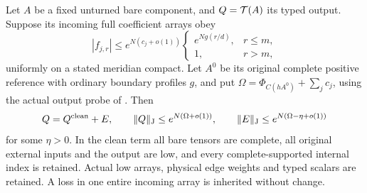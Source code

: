 \begin{theorem}\label{ms:component}
Let $A$ be a fixed unturned bare component, and $Q=\mathcal T(A)$ its
typed output. Suppose its incoming full coefficient arrays obey
\begin{equation}\label{ms:incoming}
 |f_{j,r}|\le e^{N(c_j+o(1))}
 \begin{cases}e^{Ng(r/d)},&r\le m,\\1,&r>m,\end{cases}
\end{equation}
uniformly on a stated meridian compact. Let $A^0$ be its original
complete positive reference with ordinary boundary profiles $g$,
and put $\Omega=\Phi_{C(hA^0)}+\sum_jc_j$, using the actual output
probe of \cite[Theorem 7.4]{Newton}. Then
\[
 Q=Q^{\mathrm{clean}}+E,\qquad
 \lVert Q\rVert_{\mathrm J}\le e^{N(\Omega+o(1))},\qquad
 \lVert E\rVert_{\mathrm J}\le e^{N(\Omega-\eta+o(1))}
\]
for some $\eta>0$. In the clean term all bare tensors are complete,
all original external inputs and the output are low, and every
complete-supported internal index is retained. Actual low arrays,
physical edge weights and typed scalars are retained. A loss in one
entire incoming array is inherited without change.
\end{theorem}
